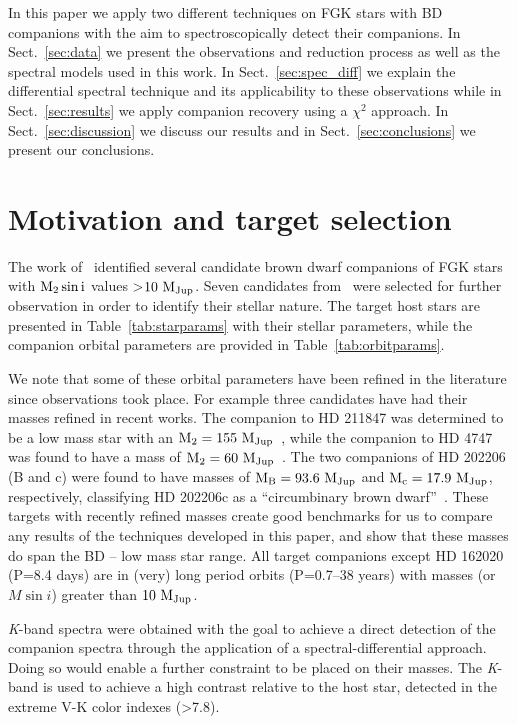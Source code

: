 \documentclass[fleqn,usenatbib]{mnras}
\newcommand*\rd{\color{red}}
\begin{document}
In this paper we apply two different techniques on FGK stars with BD companions with the aim to spectroscopically detect their companions. In Sect.~\ref{sec:data} we present the observations and reduction process as well as the spectral models used in this work. In Sect.~\ref{sec:spec_diff} we explain the differential spectral technique and its applicability to these observations while in Sect.~\ref{sec:results} we apply companion recovery using a \(\chi^{2} \) approach. In Sect.~\ref{sec:discussion} we discuss our results and in Sect.~\ref{sec:conclusions} we present our conclusions.


\section{Motivation and target selection}
\label{sec:motivation}
The work of~\citet{sahlmann_search_2011} identified several candidate brown dwarf companions of FGK stars with \(\rm M_2 \sin{i}\) values >\(\rm 10~M_{Jup}\). Seven candidates {\rd from~\citet{sahlmann_search_2011}} were selected for {\rd further} observation in order to identify their stellar nature. The target host stars are presented in Table~\ref{tab:starparams} with their stellar parameters, while the companion orbital parameters are provided in Table~\ref{tab:orbitparams}.

We note that some of these orbital parameters have been refined in the literature since observations took place. For example three candidates have had their masses refined in recent works. The companion to {HD 211847} was determined to be a low mass star with an \(\rm M_2=155~M_{Jup}\)~\citep{moutou_eccentricity_2017}, while the companion to {HD 4747} was found to have a mass of \(\rm M_2=60~M_{Jup}\)~\citep{crepp_trends_2016}. The two companions of {HD 202206} (B and c) were found to have masses of \(\rm M_B =93.6~M_{Jup}\) and \(\rm M_c = 17.9~M_{Jup}\), respectively, classifying {HD 202206}c as a ``circumbinary brown dwarf''~\citep{benedict_hd_2017}. These targets with recently refined masses create good benchmarks for us to compare any results of the techniques developed in this paper, and show that these masses do span the BD -- low mass star range. All target companions except {HD 162020} (P=8.4 days) are in (very) long period orbits (P=0.7--38 years) with masses (or \(M\sin{i}\)) greater than \(\rm 10~M_{Jup}\).

\textit{K}-band spectra were obtained with the goal to achieve a direct detection of the companion spectra through the application of a spectral-differential approach. Doing so would enable a further constraint to be placed on their masses. The \textit{K}-band is used to achieve a high contrast relative to the host star, detected in the extreme V-K color indexes (>7.8). 
\end{document}
